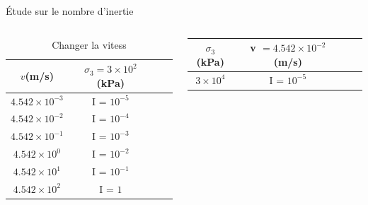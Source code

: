 \documentclass[10pt]{beamer}
\begin{document}
\begin{frame}{Étude sur le nombre d'inertie}
    \begin{columns}
        \begin{column}{0.5\textwidth}
            \begin{table}
                \centering
                \begin{tabular}{|c|c|c|c|}
                    \hline
                    $v $(m/s)                & $ \sigma_3 = 3 \times 10^2$ (kPa) \\
                    \hline
                    $4.542   \times 10^{-3}$ & I = $10^{-5}$                     \\
                    \hline
                    $4.542   \times 10^{-2}$ & I = $10^{-4}$                     \\
                    \hline
                    $4.542   \times 10^{-1}$ & I = $10^{-3}$                     \\
                    \hline
                    $4.542   \times 10^{0}$  & I = $10^{-2}$                     \\
                    \hline
                    $4.542   \times 10^{1}$  & I = $10^{-1}$                     \\
                    \hline
                    $4.542   \times 10^{2}$  & I = $1$                           \\
                    \hline
                \end{tabular}
                \caption{Changer la vitess}
            \end{table}
        \end{column}
        \begin{column}{0.5\textwidth}
            \begin{table}
                \centering
                \begin{tabular}{|c|c|c|c|}
                    \hline
                    $\sigma_{3} $(kPa) & v $ = 4.542   \times 10^{-2}$ (m/s) \\
                    \hline
                    $3 \times 10^4$    & I = $10^{-5}$                       \\

\end{tabular}
\end{table}
\end{column}
\end{columns}
\end{frame}
\end{document}

